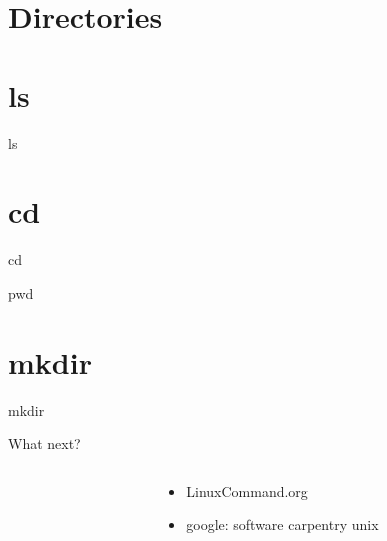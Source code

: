 \documentclass[xcolor=table]{beamer}
\begin{document}
\section{Directories}
\section{ls}
\begin{frame}
\begin{center}
\Huge ls
\end{center}
\end{frame}
\section{cd}
\begin{frame}
\begin{center}
\Huge cd
\end{center}
\end{frame}
\begin{frame}
\begin{center}
\Huge pwd
\end{center}
\end{frame}
\section{mkdir}
\begin{frame}
\begin{center}
\Huge mkdir
\end{center}
\end{frame}
\begin{frame}{What next?}
\Large
\begin{columns}
\begin{column}{.2\textwidth}
\vspace{.1in}
\end{column}
\begin{column}{.8\textwidth}
\begin{center}
\begin{itemize}
\item LinuxCommand.org\\
\item google: software carpentry unix\\
\end{itemize}
\end{center}
\end{column}
\end{columns}

\end{frame}

\end{document}
